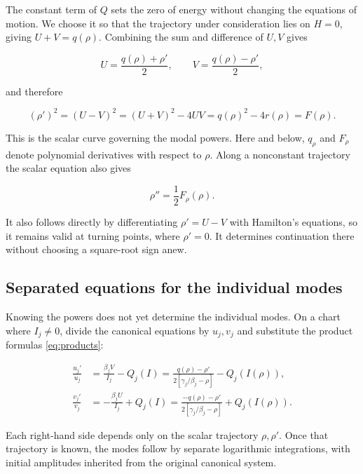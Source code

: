 \documentclass[11pt]{article}
\begin{document}
The constant term of $Q$ sets the zero of energy without changing the equations of motion. We choose it so that the trajectory under consideration lies on $H=0$, giving $U+V=q(\rho)$. Combining the sum and difference of $U,V$ gives

\begin{equation}\label{eq:products}
U=\frac{q(\rho)+\rho'}2,\qquad
V=\frac{q(\rho)-\rho'}2,
\end{equation}

and therefore

\begin{equation}\label{eq:scalar}
(\rho')^2=(U-V)^2=(U+V)^2-4UV
=q(\rho)^2-4r(\rho)=F(\rho).
\end{equation}

This is the scalar curve governing the modal powers. Here and below, $q_\rho$ and $F_\rho$ denote polynomial derivatives with respect to $\rho$. Along a nonconstant trajectory the scalar equation also gives

\[
\rho''=\frac12F_\rho(\rho).
\]

It also follows directly by differentiating $\rho'=U-V$ with Hamilton's equations, so it remains valid at turning points, where $\rho'=0$. It determines continuation there without choosing a square-root sign anew.

\subsection{Separated equations for the individual modes}

Knowing the powers does not yet determine the individual modes. On a chart where $I_j\ne0$, divide the canonical equations by $u_j,v_j$ and substitute the product formulas \eqref{eq:products}:

\begin{equation}\label{eq:mode-log}
\begin{aligned}
\frac{u_j'}{u_j}
&=\frac{\beta_jV}{I_j}-Q_j(I)
=\frac{q(\rho)-\rho'}{2[\gamma_j/\beta_j-\rho]}-Q_j(I(\rho)),\\
\frac{v_j'}{v_j}
&=-\frac{\beta_jU}{I_j}+Q_j(I)
=\frac{-q(\rho)-\rho'}{2[\gamma_j/\beta_j-\rho]}+Q_j(I(\rho)).
\end{aligned}
\end{equation}

Each right-hand side depends only on the scalar trajectory $\rho,\rho'$. Once that trajectory is known, the modes follow by separate logarithmic integrations, with initial amplitudes inherited from the original canonical system.
\end{document}
